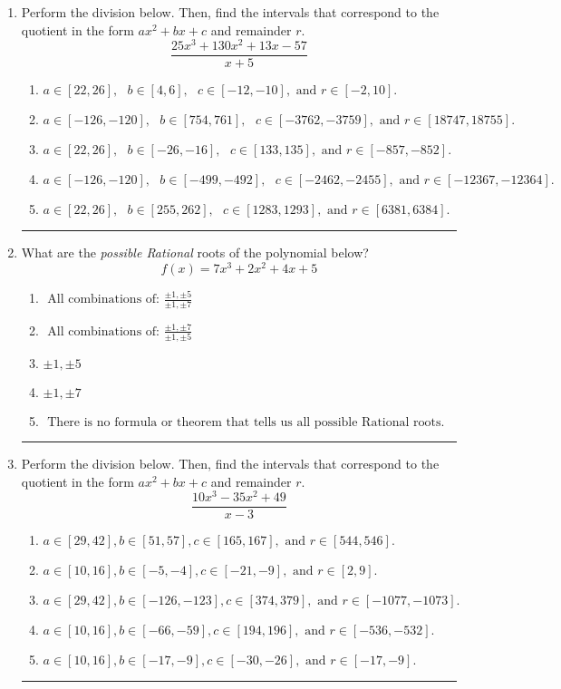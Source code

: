 \documentclass[14pt]{extbook}
\newcommand{\litem}[1]{\item#1\hspace*{-1cm}\rule{\textwidth}{0.4pt}}
\begin{document}
\begin{enumerate}
\litem{
Perform the division below. Then, find the intervals that correspond to the quotient in the form $ax^2+bx+c$ and remainder $r$.\[ \frac{25x^{3} +130 x^{2} +13 x -57}{x + 5} \]\begin{enumerate}[label=\Alph*.]
\item \( a \in [22, 26], \text{   } b \in [4, 6], \text{   } c \in [-12, -10], \text{   and   } r \in [-2, 10]. \)
\item \( a \in [-126, -120], \text{   } b \in [754, 761], \text{   } c \in [-3762, -3759], \text{   and   } r \in [18747, 18755]. \)
\item \( a \in [22, 26], \text{   } b \in [-26, -16], \text{   } c \in [133, 135], \text{   and   } r \in [-857, -852]. \)
\item \( a \in [-126, -120], \text{   } b \in [-499, -492], \text{   } c \in [-2462, -2455], \text{   and   } r \in [-12367, -12364]. \)
\item \( a \in [22, 26], \text{   } b \in [255, 262], \text{   } c \in [1283, 1293], \text{   and   } r \in [6381, 6384]. \)

\end{enumerate} }
\litem{
What are the \textit{possible Rational} roots of the polynomial below?\[ f(x) = 7x^{3} +2 x^{2} +4 x + 5 \]\begin{enumerate}[label=\Alph*.]
\item \( \text{ All combinations of: }\frac{\pm 1,\pm 5}{\pm 1,\pm 7} \)
\item \( \text{ All combinations of: }\frac{\pm 1,\pm 7}{\pm 1,\pm 5} \)
\item \( \pm 1,\pm 5 \)
\item \( \pm 1,\pm 7 \)
\item \( \text{ There is no formula or theorem that tells us all possible Rational roots.} \)

\end{enumerate} }
\litem{
Perform the division below. Then, find the intervals that correspond to the quotient in the form $ax^2+bx+c$ and remainder $r$.\[ \frac{10x^{3} -35 x^{2} + 49}{x -3} \]\begin{enumerate}[label=\Alph*.]
\item \( a \in [29, 42], b \in [51, 57], c \in [165, 167], \text{ and } r \in [544, 546]. \)
\item \( a \in [10, 16], b \in [-5, -4], c \in [-21, -9], \text{ and } r \in [2, 9]. \)
\item \( a \in [29, 42], b \in [-126, -123], c \in [374, 379], \text{ and } r \in [-1077, -1073]. \)
\item \( a \in [10, 16], b \in [-66, -59], c \in [194, 196], \text{ and } r \in [-536, -532]. \)
\item \( a \in [10, 16], b \in [-17, -9], c \in [-30, -26], \text{ and } r \in [-17, -9]. \)


\end{enumerate}}
\end{enumerate}
\end{document}
